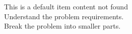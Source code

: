 \documentclass[preview]{standalone}
\begin{document}
This is a default item content not found\\Understand the problem requirements.\\Break the problem into smaller parts.\\
\end{document}
